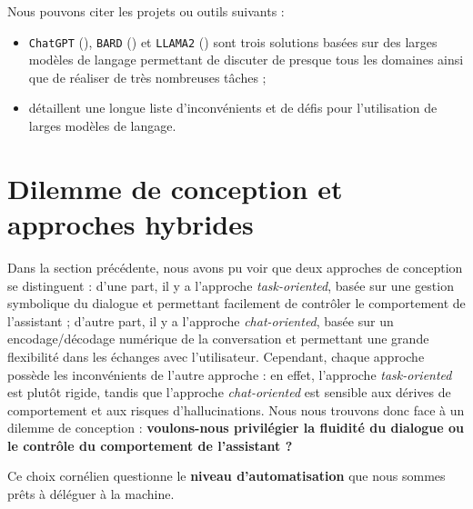 			\begin{leftBarExamples}
				Nous pouvons citer les projets ou outils suivants :
				\begin{itemize}
					\item \texttt{ChatGPT} (\cite{openai:2023:chatgpt}), \texttt{BARD} (\cite{google:2023:bard-chat-based}) et \texttt{LLAMA2} (\cite{touvron-etal:2023:llama-open-foundation}) sont trois solutions basées sur des larges modèles de langage permettant de discuter de presque tous les domaines ainsi que de réaliser de très nombreuses tâches ;
					\item \cite{kaddour-etal:2023:challenges-applications-large} détaillent une longue liste d'inconvénients et de défis pour l'utilisation de larges modèles de langage.
				\end{itemize}
			\end{leftBarExamples}
	
	
	\newpage
	\section{Dilemme de conception et approches hybrides}
	\label{annex:B.3-ANNEXE-CHATBOTS-DILEMME}
		
		Dans la section précédente, nous avons pu voir que deux approches de conception se distinguent :
		d'une part, il y a l'approche \textit{task-oriented}, basée sur une gestion symbolique du dialogue et permettant facilement de contrôler le comportement de l'assistant ;
		d'autre part, il y a l'approche \textit{chat-oriented}, basée sur un encodage/décodage numérique de la conversation et permettant une grande flexibilité dans les échanges avec l'utilisateur.
		Cependant, chaque approche possède les inconvénients de l'autre approche :
		en effet, l'approche \textit{task-oriented} est plutôt rigide, tandis que l'approche \textit{chat-oriented} est sensible aux dérives de comportement et aux risques d'hallucinations.
		Nous nous trouvons donc face à un dilemme de conception : \textbf{voulons-nous privilégier la fluidité du dialogue ou le contrôle du comportement de l'assistant ?}
		
		
		Ce choix cornélien questionne le \textbf{niveau d'automatisation} que nous sommes prêts à déléguer à la machine.
		
